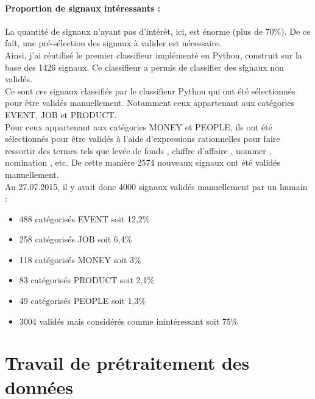         \paragraph{Proportion de signaux intéressants :}
            La quantité de signaux n'ayant pas d'intérêt, ici, est énorme (plus de 70\%). De ce fait, une pré-sélection des signaux à valider est nécessaire.\\
            Ainsi, j'ai réutilisé le premier classifieur implémenté en Python, construit sur la base des 1426 signaux. Ce classifieur a permis de classifier des signaux non validés.\\
            Ce sont ces signaux classifiés par le classifieur Python qui ont été sélectionnés pour être validés manuellement. Notamment ceux appartenant aux catégories EVENT, JOB et PRODUCT.\\
            Pour ceux appartenant aux catégories MONEY et PEOPLE, ils ont été sélectionnés pour être validés à l'aide d'expressions rationnelles pour faire ressortir des termes tels que \og levée de fonds \fg, \og chiffre d'affaire \fg, \og nommer \fg, \og nomination \fg, etc.
            De cette manière 2574 nouveaux signaux ont été validés manuellement.\\

        Au 27.07.2015, il y avait donc 4000 signaux validés manuellement par un humain :
        \begin{itemize}
            \item 488 catégorisés EVENT soit 12,2\%
            \item 258 catégorisés JOB soit 6,4\%
            \item 118 catégorisés MONEY soit 3\%
            \item 83 catégorisés PRODUCT soit 2,1\%
            \item 49 catégorisés PEOPLE soit 1,3\%
            \item 3004 validés mais considérés comme inintéressant soit 75\%
        \end{itemize}

\section{Travail de prétraitement des données} %
\label{sec:travail_de_pretraitement}

